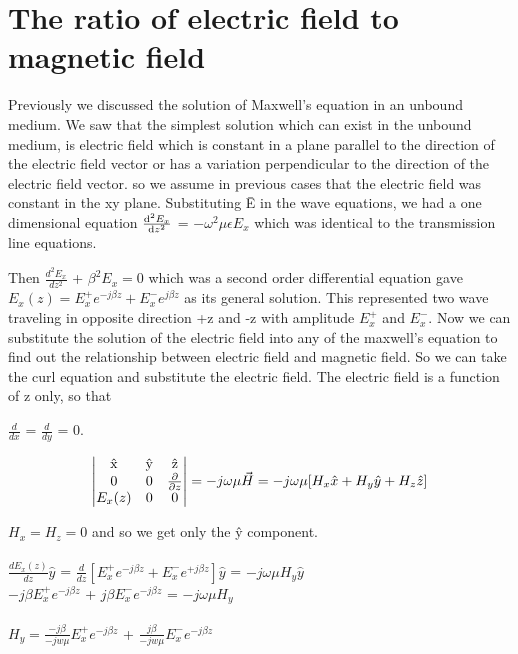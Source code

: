 \chapter{The ratio of electric field to magnetic field}\label{lec:lec22}
Previously we discussed the solution of  Maxwell's equation in an unbound medium. We saw that the simplest solution which can exist in the unbound medium, is electric field which is constant in a plane parallel to the direction of the electric field vector or has a variation perpendicular to the direction of the electric field vector. so we assume in previous cases that the electric field was constant in the xy plane. Substituting \={E} in the wave equations, we had a one dimensional equation $\dv[2]{E_x}{z}$ = $-\omega^2\mu\epsilon E_x$ which was identical to the transmission line equations. 

Then $\frac{d^2E_x}{dz^2}$ + $\beta^2 E_x = 0$ which was a second order differential equation gave $E_x({z}) = E_x^{+}e^{-j\beta z} + E_x^{-}e^{j\beta z}$ as its general solution. This represented two wave traveling in opposite direction +z and -z with amplitude $E_x^{+}$ and $E_x^{-}$. Now we can substitute the solution of the electric field into any of the maxwell's equation to find out the relationship between electric field and magnetic field. So we can take the curl equation and substitute the electric field. The electric field is a function of z only, so that

$\frac{d}{dx}$ = $\frac{d}{dy}$ = 0.


\begin{dmath*}
	\begin{vmatrix}
		$\^{x}$ & $\^{y}$ & $\^{z}$\\
		0 & 0 & \pdv{}{z} \\
		$$E_{x}(z)$$ & 0 & 0
	\end{vmatrix} =-j\omega\mu\vec{H} =-j\omega\mu[H_x\hat{x} + H_y\hat{y} + H_z\hat{z}]
\end{dmath*}

$H_x = H_z = 0$ and so we get only the \^{y} component.\\
\\
$\frac{dE_x(z)}{dz}\hat{y}$ = $\frac{d}{dz}[E_x^+e^{-j\beta z} + E_x^-e^{+j\beta z}]\hat{y}$ = $-j\omega\mu H_y\hat{y}$\\

$-j\beta E_x^+e^{-j\beta z}$ + $j\beta E_x^-e^{-j\beta z}$ = $-j\omega\mu H_y$\\
\\
$H_y = \frac{-j\beta}{-jw\mu}E_x^{+}e^{-j\beta z}$ + $\frac{j\beta}{-jw\mu}E_x^{-}e^{-j\beta z}$

